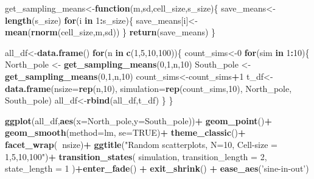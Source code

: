 \documentclass[]{book}
\newenvironment{Shaded}{\begin{snugshade}}{\end{snugshade}}
\newcommand{\ControlFlowTok}[1]{\textcolor[rgb]{0.13,0.29,0.53}{\textbf{#1}}}
\newcommand{\DataTypeTok}[1]{\textcolor[rgb]{0.13,0.29,0.53}{#1}}
\newcommand{\DecValTok}[1]{\textcolor[rgb]{0.00,0.00,0.81}{#1}}
\newcommand{\KeywordTok}[1]{\textcolor[rgb]{0.13,0.29,0.53}{\textbf{#1}}}
\newcommand{\NormalTok}[1]{#1}
\newcommand{\OperatorTok}[1]{\textcolor[rgb]{0.81,0.36,0.00}{\textbf{#1}}}
\newcommand{\OtherTok}[1]{\textcolor[rgb]{0.56,0.35,0.01}{#1}}
\newcommand{\StringTok}[1]{\textcolor[rgb]{0.31,0.60,0.02}{#1}}
\begin{document}
\begin{Shaded}
\begin{Highlighting}[]
\NormalTok{get_sampling_means<-}\ControlFlowTok{function}\NormalTok{(m,sd,cell_size,s_size)\{}
\NormalTok{  save_means<-}\KeywordTok{length}\NormalTok{(s_size)}
  \ControlFlowTok{for}\NormalTok{(i }\ControlFlowTok{in} \DecValTok{1}\OperatorTok{:}\NormalTok{s_size)\{}
\NormalTok{    save_means[i]<-}\KeywordTok{mean}\NormalTok{(}\KeywordTok{rnorm}\NormalTok{(cell_size,m,sd))}
\NormalTok{  \}}
  \KeywordTok{return}\NormalTok{(save_means)}
\NormalTok{\}}

\NormalTok{all_df<-}\KeywordTok{data.frame}\NormalTok{()}
\ControlFlowTok{for}\NormalTok{(n }\ControlFlowTok{in} \KeywordTok{c}\NormalTok{(}\DecValTok{1}\NormalTok{,}\DecValTok{5}\NormalTok{,}\DecValTok{10}\NormalTok{,}\DecValTok{100}\NormalTok{))\{}
\NormalTok{  count_sims<-}\DecValTok{0}
  \ControlFlowTok{for}\NormalTok{(sim }\ControlFlowTok{in} \DecValTok{1}\OperatorTok{:}\DecValTok{10}\NormalTok{)\{}
\NormalTok{    North_pole <-}\StringTok{ }\KeywordTok{get_sampling_means}\NormalTok{(}\DecValTok{0}\NormalTok{,}\DecValTok{1}\NormalTok{,n,}\DecValTok{10}\NormalTok{)}
\NormalTok{    South_pole <-}\StringTok{ }\KeywordTok{get_sampling_means}\NormalTok{(}\DecValTok{0}\NormalTok{,}\DecValTok{1}\NormalTok{,n,}\DecValTok{10}\NormalTok{)}
\NormalTok{      count_sims<-count_sims}\OperatorTok{+}\DecValTok{1}
\NormalTok{      t_df<-}\KeywordTok{data.frame}\NormalTok{(}\DataTypeTok{nsize=}\KeywordTok{rep}\NormalTok{(n,}\DecValTok{10}\NormalTok{),}
                       \DataTypeTok{simulation=}\KeywordTok{rep}\NormalTok{(count_sims,}\DecValTok{10}\NormalTok{),}
\NormalTok{                       North_pole,}
\NormalTok{                       South_pole)}
\NormalTok{      all_df<-}\KeywordTok{rbind}\NormalTok{(all_df,t_df)}
\NormalTok{  \}}
\NormalTok{\}}


\KeywordTok{ggplot}\NormalTok{(all_df,}\KeywordTok{aes}\NormalTok{(}\DataTypeTok{x=}\NormalTok{North_pole,}\DataTypeTok{y=}\NormalTok{South_pole))}\OperatorTok{+}
\StringTok{  }\KeywordTok{geom_point}\NormalTok{()}\OperatorTok{+}
\StringTok{  }\KeywordTok{geom_smooth}\NormalTok{(}\DataTypeTok{method=}\NormalTok{lm, }\DataTypeTok{se=}\OtherTok{TRUE}\NormalTok{)}\OperatorTok{+}
\StringTok{  }\KeywordTok{theme_classic}\NormalTok{()}\OperatorTok{+}
\StringTok{  }\KeywordTok{facet_wrap}\NormalTok{(}\OperatorTok{~}\NormalTok{nsize)}\OperatorTok{+}
\StringTok{  }\KeywordTok{ggtitle}\NormalTok{(}\StringTok{"Random scatterplots, N=10, Cell-size = 1,5,10,100"}\NormalTok{)}\OperatorTok{+}
\StringTok{  }\KeywordTok{transition_states}\NormalTok{(}
\NormalTok{    simulation,}
    \DataTypeTok{transition_length =} \DecValTok{2}\NormalTok{,}
    \DataTypeTok{state_length =} \DecValTok{1}
\NormalTok{  )}\OperatorTok{+}\KeywordTok{enter_fade}\NormalTok{() }\OperatorTok{+}\StringTok{ }
\StringTok{  }\KeywordTok{exit_shrink}\NormalTok{() }\OperatorTok{+}
\StringTok{  }\KeywordTok{ease_aes}\NormalTok{(}\StringTok{'sine-in-out'}\NormalTok{)}
\end{Highlighting}
\end{Shaded}
\end{document}
